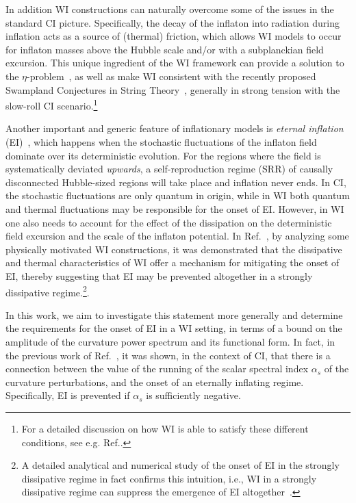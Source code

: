 In addition WI constructions can naturally overcome some of the issues in the standard CI picture. Specifically, the decay of the inflaton into radiation during inflation acts as a source of (thermal) friction, which allows
WI models to occur for inflaton masses above the Hubble scale and/or with a subplanckian field excursion. This unique ingredient of the WI framework can provide a solution to the
$\eta$-problem~\cite{Bastero-Gil:2019gao}, as well as make WI
consistent with the recently proposed Swampland Conjectures in String
Theory~\cite{Das:2018hqy,Motaharfar:2018zyb,Das:2018rpg,Das:2019hto,Kamali:2019xnt,Brandenberger:2020oav,Das:2020xmh}, generally in strong
tension with the slow-roll CI scenario.\footnote{For a detailed discussion on how WI is able to satisfy these different conditions, see e.g. Ref.\cite{Berera:2023liv}. }

Another important and generic feature of inflationary models is \textit{eternal inflation}
(EI)~\cite{Vilenkin:1983xq,Guth:1985ya,Linde:1986fc,Linde:1986fd,Starobinsky:1986fx},
which happens when the stochastic fluctuations of the inflaton field
dominate over its deterministic evolution. {}For the regions where the
field is systematically deviated {\it upwards},   a self-reproduction
regime (SRR) of causally disconnected Hubble-sized regions will take
place and inflation never ends. In CI, the stochastic fluctuations are
only quantum in origin, while in WI both quantum and thermal
fluctuations may be responsible for the onset of EI. However, in WI
one also needs to account for the effect of the dissipation on the
deterministic field excursion and the scale of the inflaton
potential. In Ref.~\cite{Vicente:2015hga}, by analyzing some physically motivated WI constructions, it was demonstrated  that the dissipative and thermal characteristics of WI offer a mechanism for mitigating the onset of EI,
thereby suggesting that EI may be prevented altogether in a strongly dissipative regime.\footnote{A detailed analytical and numerical study of the onset of EI in the strongly dissipative regime in fact confirms this intuition, i.e., WI in a strongly dissipative regime can suppress the emergence of EI altogether~\cite{MRVFeistudy}.}.

In this work, we aim to investigate this statement more generally and determine the requirements for the onset of EI in a WI setting, in terms of a bound on the amplitude of the curvature power spectrum and its functional form. In fact, in the previous work of Ref.~\cite{Kinney:2014jya}, it was shown, in
the context of CI, that there is a connection between the value of the
running of the scalar spectral index $\alpha_s$ of the curvature
perturbations, and the onset of an eternally inflating regime.  Specifically, EI is prevented if
$\alpha_s$ is sufficiently negative.

